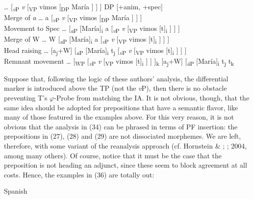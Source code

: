 \documentclass[output=paper]{langsci/langscibook}
\begin{document}
\ea
    \ea …  [\textit{\textsubscript{v}}\textsubscript{P}  \textit{v}  [\textsubscript{VP} vimos   [\textsubscript{DP} María ] ] ]    DP [+anim, +spec]\\
    Merge of \textit{a}
    \ex  …  a  [\textit{\textsubscript{v}}\textsubscript{P}  \textit{v}  [\textsubscript{VP} vimos   [\textsubscript{DP} María ] ] ]\\
    Movement to Spec 
    \ex  …  [\textit{\textsubscript{a}}\textsubscript{P} [María]\textsubscript{i}  a  [\textit{\textsubscript{v}}\textsubscript{P}  \textit{v}  [\textsubscript{VP} vimos [t]\textsubscript{i} ] ] ] \\
    Merge of W 
    \ex …  W [\textit{\textsubscript{a}}\textsubscript{P} [María]\textsubscript{i}  a  [\textit{\textsubscript{v}}\textsubscript{P}  \textit{v}  [\textsubscript{VP} vimos [t]\textsubscript{i} ] ] ]  \\
    Head raising 
    \ex …  [a\textsubscript{j}+W] [\textit{\textsubscript{a}}\textsubscript{P} [María]\textsubscript{i}  t\textsubscript{j}  [\textit{\textsubscript{v}}\textsubscript{P}  \textit{v}  [\textsubscript{VP} vimos [t]\textsubscript{i} ] ] ]  \\
    Remnant movement
    \ex …  [\textsubscript{WP}  [\textit{\textsubscript{v}}\textsubscript{P}  \textit{v}  [\textsubscript{VP} vimos [t]\textsubscript{i} ] ] ]\textsubscript{k} [a\textsubscript{j}+W] [\textit{\textsubscript{à}}\textsubscript{P} [María]\textsubscript{i}  t\textsubscript{j}  t\textsubscript{k}  
    \z
\z

Suppose that, following the logic of these authors’ analysis, the differential marker is introduced above the TP (not the \textit{v}P), then there is no obstacle preventing T’s $\varphi ${}-Probe from matching the IA. It is not obvious, though, that the same idea should be adopted for prepositions that have a semantic flavor, like many of those featured in the examples above. For this very reason, it is not obvious that the analysis in (34) can be phrased in terms of PF insertion: the prepositions in (27), (28) and (29) are not dissociated morphemes. We are left, therefore, with some variant of the reanalysis approach (cf. Hornstein \& \citealt{Weinberg1981}; \citealt{Kayne1975}; 2004, among many others). Of course, notice that it must be the case that the preposition is not heading an adjunct, since these seem to block agreement at all costs. Hence, the examples in (36) are totally out:



\ea%
    Spanish\label{ex:gallego:36}\\
    \z
\z    
\end{document}
